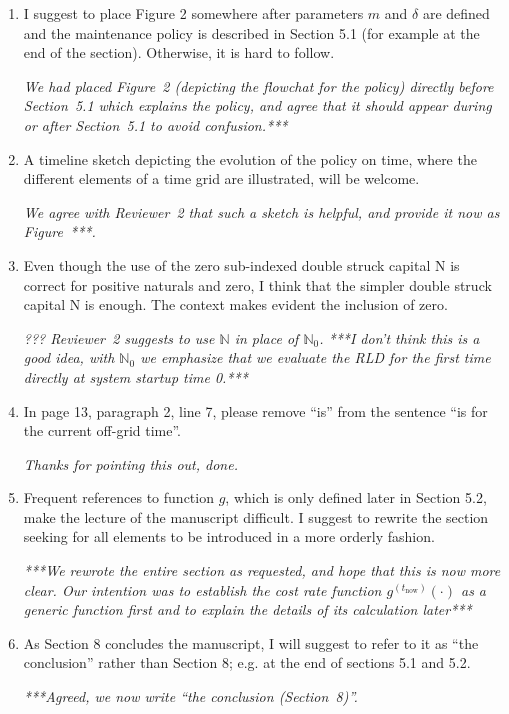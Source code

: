 \documentclass[authoryear]{elsarticle}
\newcommand{\naturals}{\mathbb{N}}
\def\tnow{t_\text{now}}
\begin{document}
\begin{enumerate}
\item I suggest to place Figure 2 somewhere after parameters $m$ and $\delta$ are defined and the maintenance policy is described in Section 5.1 (for example at the end of the section). Otherwise, it is hard to follow.

\smallskip

\emph{We had placed Figure~2 (depicting the flowchat for the policy) directly before Section~5.1 which explains the policy,
and agree that it should appear during or after Section~5.1 to avoid confusion.***}

\item A timeline sketch depicting the evolution of the policy on time, where the different elements of a time grid are illustrated, will be welcome.

\smallskip

\emph{We agree with Reviewer~2 that such a sketch is helpful, and provide it now as Figure~***.}

\item Even though the use of the zero sub-indexed double struck capital N is correct for positive naturals and zero, I think that the simpler double struck capital N is enough. The context makes evident the inclusion of zero.

\smallskip

\emph{??? Reviewer~2 suggests to use $\naturals$ in place of $\naturals_0$.
***I don't think this is a good idea, with $\naturals_0$ we emphasize that
we evaluate the RLD for the first time directly at system startup time 0.***}

\item In page 13, paragraph 2, line 7, please remove “is” from the sentence “is for the current off-grid time”.

\smallskip

\emph{Thanks for pointing this out, done.}

\item Frequent references to function $g$, which is only defined later in Section 5.2, make the lecture of the manuscript difficult. I suggest to rewrite the section seeking for all elements to be introduced in a more orderly fashion.

\smallskip

\emph{***We rewrote the entire section as requested, and hope that this is now more clear.
Our intention was to establish the cost rate function $g^{(\tnow)}(\cdot)$ as a generic function first
and to explain the details of its calculation later***}

\item As Section 8 concludes the manuscript, I will suggest to refer to it as “the conclusion” rather than Section 8; e.g. at the end of sections 5.1 and 5.2.

\smallskip

\emph{***Agreed, we now write ``the conclusion (Section~8)''.}
\end{enumerate}
\end{document}
